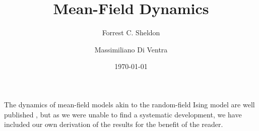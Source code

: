\documentclass[aps,prl,reprint,groupedaddress]{revtex4-1}
\begin{document}

    \title{Mean-Field Dynamics}

\author{Forrest C. Sheldon}


\author{Massimiliano Di Ventra}




\date{\today}

\pacs{}

\maketitle

The dynamics of mean-field models akin to the random-field Ising model are well published \cite{Sethna1993}, but as we were unable to find a systematic development, we have included our own derivation of the
results for the benefit of the reader.
\end{document}
